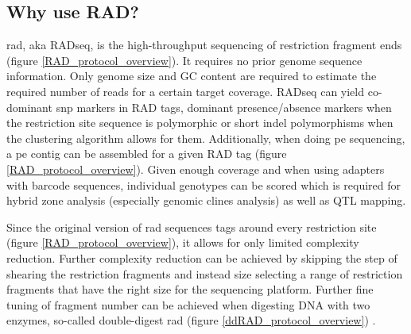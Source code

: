 \documentclass[a4paper,12pt,times,print,index,custombib,custommargin]{PhDThesisPSnPDF}\usepackage[]{graphicx}\usepackage[]{color}
\begin{document}
\subsection{Why use RAD?}
\gls{rad}, aka RADseq, is the high-throughput sequencing of restriction fragment ends (figure \ref{RAD_protocol_overview}). It requires no prior genome sequence information. Only genome size and GC content are required to estimate the required number of \glspl{read} for a certain target coverage. 
RADseq can yield co-dominant \gls{snp} markers in \glspl{RAD tag}, dominant presence/absence markers when the restriction site sequence is polymorphic or short indel polymorphisms when the clustering algorithm allows for them. Additionally, when doing \gls{pe} sequencing, a \gls{pe} contig can be assembled for a given \gls{RAD tag} (figure \ref{RAD_protocol_overview}).
Given enough coverage and when using adapters with barcode sequences, individual genotypes can be scored which is required for hybrid zone analysis (especially genomic clines analysis) as well as QTL mapping. 

Since the original version of \gls{rad} sequences tags around every restriction site (figure \ref{RAD_protocol_overview}), it allows for only limited complexity reduction. Further complexity reduction can be achieved by skipping the step of shearing the restriction fragments and instead size selecting a range of restriction fragments that have the right size for the sequencing platform. Further fine tuning of fragment number can be achieved when digesting DNA with two enzymes, so-called double-digest \gls{rad} (figure \ref{ddRAD_protocol_overview}) \citep{Peterson2012}.
\end{document}
